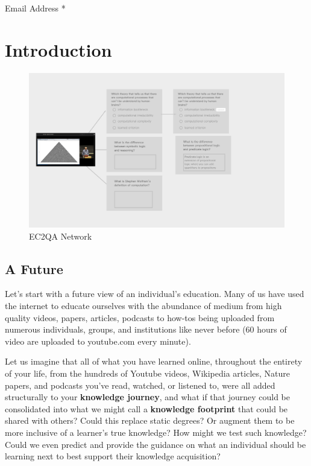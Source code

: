 \documentclass[]{book}
\theoremstyle{definition}
\theoremstyle{definition}
\theoremstyle{definition}
\theoremstyle{remark}
\begin{document}
Email Address *

\hypertarget{mce-responses}{}
\hypertarget{mce-error-response}{}

\hypertarget{mce-success-response}{}

\chapter{Introduction}\label{introduction}

\begin{figure}
\centering
\includegraphics{img/MtoQA.png}
\caption{EC2QA Network}
\end{figure}

\section{A Future}\label{a-future}

Let's start with a future view of an individual's education. Many of us
have used the internet to educate ourselves with the abundance of medium
from high quality videos, papers, articles, podcasts to how-tos being
uploaded from numerous individuals, groups, and institutions like never
before (60 hours of video are uploaded to youtube.com every minute).

Let us imagine that all of what you have learned online, throughout the
entirety of your life, from the hundreds of Youtube videos, Wikipedia
articles, Nature papers, and podcasts you've read, watched, or listened
to, were all added structurally to your \textbf{knowledge journey}, and
what if that journey could be consolidated into what we might call a
\textbf{knowledge footprint} that could be shared with others? Could
this replace static degrees? Or augment them to be more inclusive of a
learner's true knowledge? How might we test such knowledge? Could we
even predict and provide the guidance on what an individual should be
learning next to best support their knowledge acquisition?
\end{document}
